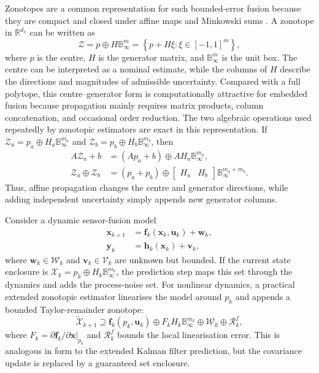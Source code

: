 \documentclass{ieeeaccess}
\newcommand{\added}[1]{\textcolor{RevisionBlue}{#1}}
\begin{document}
Zonotopes are a common representation for such bounded-error fusion because they are compact and closed under affine maps and Minkowski sums \cite{girard2005_zonotopes}. A zonotope in $\mathbb{R}^{d_x}$ can be written as
\begin{equation}
\mathcal{Z}=p\oplus H\mathbb{B}_{\infty}^{m}
=\left\{p+H\xi:\xi\in[-1,1]^m\right\},
\end{equation}
where $p$ is the centre, $H$ is the generator matrix, and $\mathbb{B}_{\infty}^{m}$ is the unit box. The centre can be interpreted as a nominal estimate, while the columns of $H$ describe the directions and magnitudes of admissible uncertainty. Compared with a full polytope, this centre--generator form is computationally attractive for embedded fusion because propagation mainly requires matrix products, column concatenation, and occasional order reduction.
The two algebraic operations used repeatedly by zonotopic estimators are exact in this representation. If $\mathcal{Z}_a=p_a\oplus H_a\mathbb{B}_{\infty}^{m_a}$ and $\mathcal{Z}_b=p_b\oplus H_b\mathbb{B}_{\infty}^{m_b}$, then
\begin{align}
A\mathcal{Z}_a+b
&=(Ap_a+b)\oplus AH_a\mathbb{B}_{\infty}^{m_a},\\
\mathcal{Z}_a\oplus\mathcal{Z}_b
&=(p_a+p_b)\oplus
\begin{bmatrix}H_a&H_b\end{bmatrix}
\mathbb{B}_{\infty}^{m_a+m_b}.
\end{align}
Thus\added{,} affine propagation changes the centre and generator directions, while adding independent uncertainty simply appends new generator columns.

Consider a dynamic sensor-fusion model
\begin{align}
\mathbf{x}_{k+1}&=\mathbf{f}_k(\mathbf{x}_k,\mathbf{u}_k)+\mathbf{w}_k,\\
\mathbf{y}_k&=\mathbf{h}_k(\mathbf{x}_k)+\mathbf{v}_k,
\end{align}
where $\mathbf{w}_k\in\mathcal{W}_k$ and $\mathbf{v}_k\in\mathcal{V}_k$ are unknown but bounded. If the current state enclosure is $\mathcal{X}_k=p_k\oplus H_k\mathbb{B}_{\infty}^{m_k}$, the prediction step maps this set through the dynamics and adds the process-noise set. For nonlinear dynamics, a practical extended zonotopic estimator linearises the model around $p_k$ and appends a bounded Taylor-remainder zonotope:
\begin{equation}
\widetilde{\mathcal{X}}_{k+1}
\supseteq
\mathbf{f}_k(p_k,\mathbf{u}_k)
\oplus F_k H_k\mathbb{B}_{\infty}^{m_k}
\oplus \mathcal{W}_k
\oplus \mathcal{R}^{f}_k,
\end{equation}
where $F_k=\partial \mathbf{f}_k/\partial \mathbf{x}|_{p_k}$ and $\mathcal{R}^{f}_k$ bounds the local linearisation error. This is analogous in form to the extended Kalman filter prediction, but the covariance update is replaced by a guaranteed set enclosure.
\end{document}
